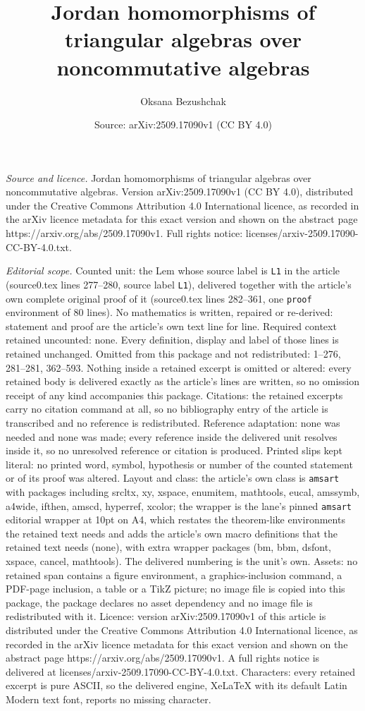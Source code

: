 \documentclass[10pt,a4paper]{amsart}
\title[Jordan homomorphisms of triangular algebras over noncommutat]{Jordan homomorphisms of triangular algebras over noncommutative algebras}
\author{Oksana Bezushchak}
\date{Source: arXiv:2509.17090v1 (CC BY 4.0)}
\begin{document}
\maketitle

\noindent\emph{Source and licence.} Jordan homomorphisms of triangular algebras over noncommutative algebras. Version arXiv:2509.17090v1 (CC BY 4.0), distributed under the Creative Commons Attribution 4.0 International licence, as recorded in the arXiv licence metadata for this exact version and shown on the abstract page https://arxiv.org/abs/2509.17090v1. Full rights notice: licenses/arxiv-2509.17090-CC-BY-4.0.txt.\par\smallskip

\noindent\textit{Editorial scope.} Counted unit: the Lem whose source label is \texttt{L1} in the article (source0.tex lines 277--280, source label \texttt{L1}), delivered together with the article's own complete original proof of it (source0.tex lines 282--361, one \texttt{proof} environment of 80 lines). No mathematics is written, repaired or re-derived: statement and proof are the article's own text line for line. Required context retained uncounted: none. Every definition, display and label of those lines is retained unchanged. Omitted from this package and not redistributed: 1--276, 281--281, 362--593. Nothing inside a retained excerpt is omitted or altered: every retained body is delivered exactly as the article's lines are written, so no omission receipt of any kind accompanies this package. Citations: the retained excerpts carry no citation command at all, so no bibliography entry of the article is transcribed and no reference is redistributed. Reference adaptation: none was needed and none was made; every reference inside the delivered unit resolves inside it, so no unresolved reference or citation is produced. Printed slips kept literal: no printed word, symbol, hypothesis or number of the counted statement or of its proof was altered. Layout and class: the article's own class is \texttt{amsart} with packages including srcltx, xy, xspace, enumitem, mathtools, eucal, amssymb, a4wide, ifthen, amscd, hyperref, xcolor; the wrapper is the lane's pinned \texttt{amsart} editorial wrapper at 10pt on A4, which restates the theorem-like environments the retained text needs and adds the article's own macro definitions that the retained text needs (none), with extra wrapper packages (bm, bbm, dsfont, xspace, cancel, mathtools). The delivered numbering is the unit's own. Assets: no retained span contains a figure environment, a graphics-inclusion command, a PDF-page inclusion, a table or a TikZ picture; no image file is copied into this package, the package declares no asset dependency and no image file is redistributed with it. Licence: version arXiv:2509.17090v1 of this article is distributed under the Creative Commons Attribution 4.0 International licence, as recorded in the arXiv licence metadata for this exact version and shown on the abstract page https://arxiv.org/abs/2509.17090v1. A full rights notice is delivered at licenses/arxiv-2509.17090-CC-BY-4.0.txt. Characters: every retained excerpt is pure ASCII, so the delivered engine, XeLaTeX with its default Latin Modern text font, reports no missing character.
\end{document}
